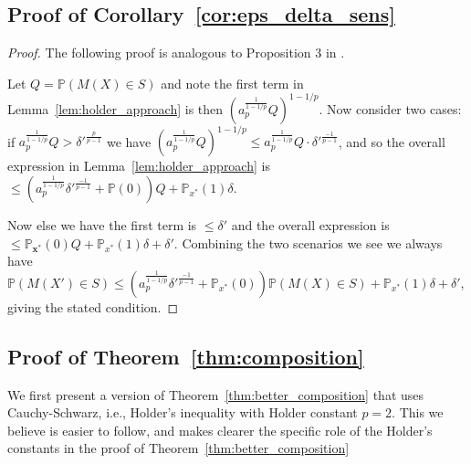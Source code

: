 \subsection{Proof of Corollary~\ref{cor:eps_delta_sens}}
\label{proof:eps_delta_sens}

\begin{proof}

The following proof is analogous to Proposition 3 in \cite{mironov2017renyi}.

Let $Q = \mathbb{P}(M(X) \in S)$ and note the first term in Lemma~\ref{lem:holder_approach} is then $(a_p^{\frac{1}{1-1/p}}Q)^{1- 1/p}$. Now consider two cases: if $a_p^{\frac{1}{1-1/p}}Q > \delta'^{\frac{p}{p-1}}$ we have $(a_p^{\frac{1}{1-1/p}}Q)^{1- 1/p} \leq a_p^{\frac{1}{1-1/p}}Q \cdot \delta'^{\frac{-1}{p-1}}$, and so the overall expression in Lemma~\ref{lem:holder_approach} is $\leq (a_p^{\frac{1}{1-1/p}} \delta'^{\frac{-1}{p-1}} + \mathbb{P}(0))Q + \mathbb{P}_{x^*}(1)\delta$.

Now else we have the first term is $\leq \delta'$ and the overall expression is $\leq \mathbb{P}_{\mathbf{x}^*}(0) Q + \mathbb{P}_{x^*}(1)\delta + \delta'$. Combining the two scenarios we see we always have $\mathbb{P}(M(X') \in S) \leq (a_p^{\frac{1}{1-1/p}}\delta'^{\frac{-1}{p-1}} + \mathbb{P}_{x^*}(0)) \mathbb{P}(M(X) \in S) + \mathbb{P}_{x^*}(1)\delta + \delta'$, giving the stated condition.

\end{proof}



\subsection{Proof of Theorem~\ref{thm:composition}}
\label{proof:composition}

We first present a version of Theorem~\ref{thm:better_composition} that uses Cauchy-Schwarz, i.e., Holder's inequality with Holder constant $p=2$. This we believe is easier to follow, and makes clearer the specific role of the Holder's constants in the proof of Theorem~\ref{thm:better_composition}


